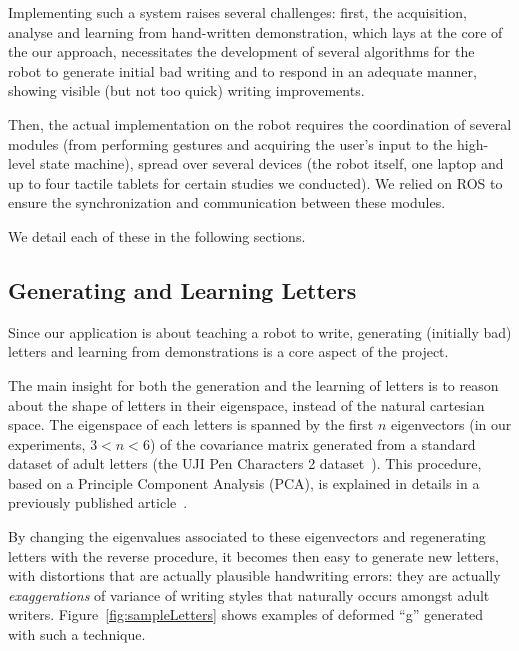 \documentclass{article}
\begin{document}
Implementing such a system raises several challenges: first, the acquisition,
analyse and learning from hand-written demonstration, which lays at the core of the
our approach, necessitates the development of several algorithms for the robot to generate
initial bad writing and to respond in an adequate manner, showing visible (but
not too quick) writing improvements.

Then, the actual implementation on the robot requires the coordination of
several modules (from performing gestures and acquiring the user's input to
the high-level state machine), spread over several devices (the robot itself,
one laptop and up to four tactile tablets for certain studies we conducted). We
relied on ROS to ensure the synchronization and communication between these
modules.

We detail each of these in the following sections.

\subsection{Generating and Learning Letters}

Since our application is about teaching a robot to write, generating (initially
bad) letters and learning from demonstrations is a core aspect of the project.

The main insight for both the generation and the learning of letters is to
reason about the shape of letters in their eigenspace, instead of the natural
cartesian space. The eigenspace of each letters is spanned by the first $n$
eigenvectors (in our experiments, $3 < n < 6$) of the covariance matrix
generated from a standard dataset of adult letters (the UJI Pen Characters 2
dataset~\cite{Llorens2008}).  This procedure, based on a Principle Component
Analysis (PCA), is explained in details in a previously published
article~\cite{hood2015when}.

By changing the eigenvalues associated to these eigenvectors and regenerating
letters with the reverse procedure, it becomes then easy to generate new
letters, with distortions that are actually plausible handwriting errors: they
are actually \emph{exaggerations} of variance of writing styles that naturally
occurs amongst adult writers.  Figure~\ref{fig:sampleLetters} shows examples of
deformed ``g'' generated with such a technique.
\end{document}
